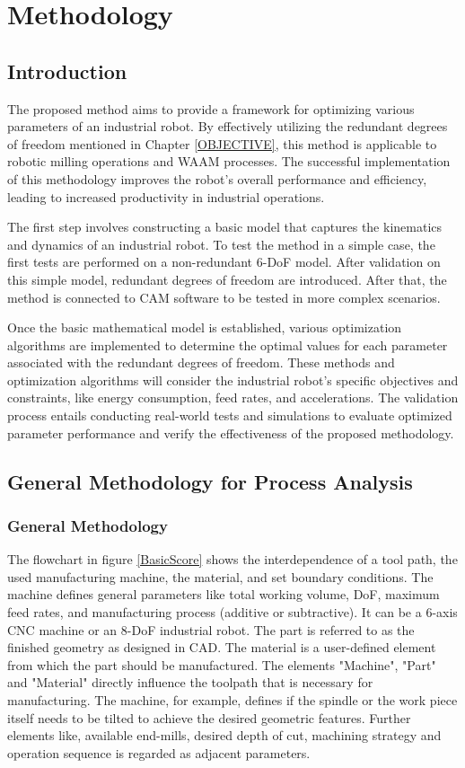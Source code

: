 \chapter{Methodology}%

\section{Introduction}%

The proposed method aims to provide a framework for optimizing various parameters of an industrial robot. By effectively utilizing the redundant degrees of freedom mentioned in Chapter \ref{OBJECTIVE}, this method is applicable to robotic milling operations and WAAM processes. The successful implementation of this methodology improves the robot's overall performance and efficiency, leading to increased productivity in industrial operations.

The first step involves constructing a basic model that captures the kinematics and dynamics of an industrial robot. To test the method in a simple case, the first tests are performed on a non-redundant 6-DoF model. After validation on this simple model, redundant degrees of freedom are introduced. After that, the method is connected to CAM software to be tested in more complex scenarios.

Once the basic mathematical model is established, various optimization algorithms are implemented to determine the optimal values for each parameter associated with the redundant degrees of freedom. These methods and optimization algorithms will consider the industrial robot's specific objectives and constraints, like energy consumption, feed rates, and accelerations. The validation process entails conducting real-world tests and simulations to evaluate optimized parameter performance and verify the effectiveness of the proposed methodology.


\section{General Methodology for Process Analysis}
\subsection{General Methodology}\label{general}

The flowchart in figure \ref{BasicScore} shows the interdependence of a tool path, the used manufacturing machine, the material, and set boundary conditions. The machine defines general parameters like total working volume, DoF, maximum feed rates, and manufacturing process (additive or subtractive). It can be a 6-axis CNC machine or an 8-DoF industrial robot. The part is referred to as the finished geometry as designed in CAD. The material is a user-defined element from which the part should be manufactured. The elements "Machine", "Part" and "Material" directly influence the toolpath that is necessary for manufacturing. The machine, for example, defines if the spindle or the work piece itself needs to be tilted to achieve the desired geometric features. Further elements like, available end-mills, desired depth of cut, machining strategy and operation sequence is regarded as adjacent parameters. 

